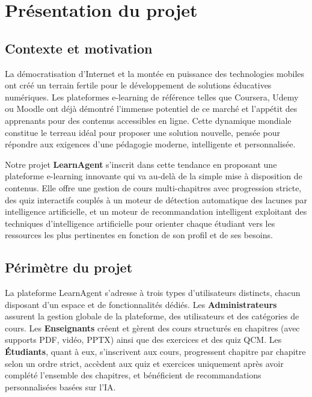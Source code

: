 \documentclass[12pt,a4paper]{report}
\begin{document}
\section{Présentation du projet}

\subsection{Contexte et motivation}

La démocratisation d'Internet et la montée en puissance des technologies mobiles ont créé un terrain fertile pour le développement de solutions éducatives numériques. Les plateformes e-learning de référence telles que Coursera, Udemy ou Moodle ont déjà démontré l'immense potentiel de ce marché et l'appétit des apprenants pour des contenus accessibles en ligne. Cette dynamique mondiale constitue le terreau idéal pour proposer une solution nouvelle, pensée pour répondre aux exigences d'une pédagogie moderne, intelligente et personnalisée.

Notre projet \textbf{LearnAgent} s'inscrit dans cette tendance en proposant une plateforme e-learning innovante qui va au-delà de la simple mise à disposition de contenus. Elle offre une gestion de cours multi-chapitres avec progression stricte, des quiz interactifs couplés à un moteur de détection automatique des lacunes par intelligence artificielle, et un moteur de recommandation intelligent exploitant des techniques d'intelligence artificielle pour orienter chaque étudiant vers les ressources les plus pertinentes en fonction de son profil et de ses besoins.

\subsection{Périmètre du projet}

La plateforme LearnAgent s'adresse à trois types d'utilisateurs distincts, chacun disposant d'un espace et de fonctionnalités dédiés. Les \textbf{Administrateurs} assurent la gestion globale de la plateforme, des utilisateurs et des catégories de cours. Les \textbf{Enseignants} créent et gèrent des cours structurés en chapitres (avec supports PDF, vidéo, PPTX) ainsi que des exercices et des quiz QCM. Les \textbf{Étudiants}, quant à eux, s'inscrivent aux cours, progressent chapitre par chapitre selon un ordre strict, accèdent aux quiz et exercices uniquement après avoir complété l'ensemble des chapitres, et bénéficient de recommandations personnalisées basées sur l'IA.
\end{document}
